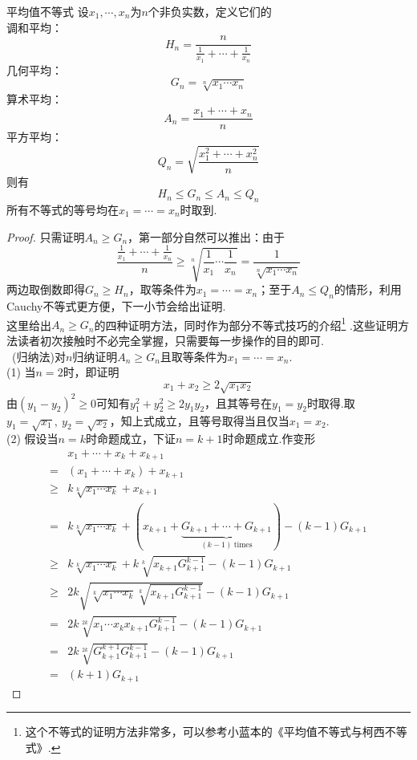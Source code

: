 \documentclass[lang=cn, zihao=5]{elegantbook}
\newcommand{\pw}[1]{\boxed{\text{证法 #1}} \ }
\begin{document}
\begin{theorem}{平均值不等式}
	设$x_1, \cdots ,x_n$为$n$个非负实数，定义它们的 \\
	调和平均：$$H_n = \frac{n}{\frac{1}{x_1} + \cdots + \frac{1}{x_n}}$$
	几何平均：$$G_n = \sqrt[n]{x_1 \cdots x_n}$$
	算术平均：$$A_n = \frac{x_1+ \cdots + x_n}{n}$$
	平方平均：$$Q_n = \sqrt{\frac{x_1^2 + \cdots + x_n^2}{n}}$$
	则有$$H_n \leq G_n \leq A_n \leq Q_n$$
	所有不等式的等号均在$x_1 = \cdots = x_n$时取到.
\end{theorem}
\begin{proof}
	只需证明$A_n \geq G_n$，第一部分自然可以推出：由于$$\frac{\frac{1}{x_1} + \cdots + \frac{1}{x_n}}{n} \geq \sqrt[n]{\frac{1}{x_1} \cdots \frac{1}{x_n}} = \frac{1}{\sqrt[n]{x_1 \cdots x_n}}$$
	两边取倒数即得$G_n \geq H_n$，取等条件为$x_1= \cdots = x_n$；至于$A_n \leq Q_n$的情形，利用Cauchy不等式更方便，下一小节会给出证明. \\
	这里给出$A_n \geq G_n$的四种证明方法，同时作为部分不等式技巧的介绍\footnote{这个不等式的证明方法非常多，可以参考小蓝本的《平均值不等式与柯西不等式》.} .这些证明方法读者初次接触时不必完全掌握，只需要每一步操作的目的即可.\\
	\pw{一}(归纳法)对$n$归纳证明$A_n \geq G_n$且取等条件为$x_1 = \cdots = x_n$. \\
	(1) 当$n=2$时，即证明$$x_1+x_2 \geq 2\sqrt{x_1x_2}$$
	由$(y_1-y_2)^2 \geq 0$可知有$y_1^2 + y_2^2 \geq 2y_1y_2$，且其等号在$y_1=y_2$时取得.取$y_1=\sqrt{x_1},~y_2=\sqrt{x_2}$，知上式成立，且等号取得当且仅当$x_1=x_2$. \\
	(2) 假设当$n=k$时命题成立，下证$n=k+1$时命题成立.作变形
	\begin{align*}
		&x_1 + \cdots + x_k + x_{k+1} \\
		=& (x_1 + \cdots + x_k) + x_{k+1} \\
		\geq & k\sqrt[k]{x_1 \cdots x_k} + x_{k+1} \\
		=& k\sqrt[k]{x_1 \cdots x_k} + (x_{k+1} + \underbrace{G_{k+1} + \cdots + G_{k+1}}_{(k-1) ~\text{times}}) -(k-1)G_{k+1} \\
		\geq & k\sqrt[k]{x_1 \cdots x_k} + k\sqrt[k]{x_{k+1}G_{k+1}^{k-1}} -(k-1)G_{k+1} \\
		\geq & 2k\sqrt{\sqrt[k]{x_1 \cdots x_k} \sqrt[k]{x_{k+1}G_{k+1}^{k-1}}} -(k-1)G_{k+1} \\
		=& 2k\sqrt[2k]{x_1 \cdots x_kx_{k+1} G_{k+1}^{k-1}} -(k-1)G_{k+1} \\
		=& 2k\sqrt[2k]{G_{k+1}^{k+1} G_{k+1}^{k-1}} -(k-1)G_{k+1} \\
		=& (k+1)G_{k+1}

\end{align*}
\end{proof}
\end{document}
